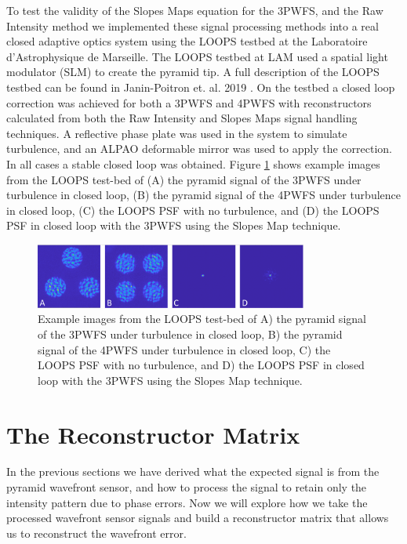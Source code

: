 To test the validity of the Slopes Maps equation for the 3PWFS, and the Raw Intensity method we implemented these signal processing methods into a real closed adaptive optics system using the LOOPS testbed at the Laboratoire d'Astrophysique de Marseille. The LOOPS testbed at LAM used a spatial light modulator (SLM) to create the pyramid tip. A full description of the LOOPS testbed can be found in Janin-Poitron et. al. 2019 \cite{janin2019adaptive}. On the testbed a closed loop correction was achieved for both a 3PWFS and 4PWFS with reconstructors calculated from both the Raw Intensity and Slopes Maps signal handling techniques. A reflective phase plate was used in the system to simulate turbulence, and an ALPAO deformable mirror was used to apply the correction. In all cases a stable closed loop was obtained. Figure \ref{fig:LOOOPS} shows example images from the LOOPS test-bed of (A) the pyramid signal of the 3PWFS under turbulence in closed loop, (B) the pyramid signal of the 4PWFS under turbulence in closed loop, (C) the LOOPS PSF with no turbulence, and (D) the LOOPS PSF in closed loop with the 3PWFS using the Slopes Map technique. 

\begin{figure}
    \centering
    \includegraphics[width=0.8\textwidth]{Chapter Materials/Chapter Two Materials/LOOPS.png}
    \caption{Example images from the LOOPS test-bed of A) the pyramid signal of the 3PWFS under turbulence in closed loop, B) the pyramid signal of the 4PWFS under turbulence in closed loop, C) the LOOPS PSF with no turbulence, and D) the LOOPS PSF in closed loop with the 3PWFS using the Slopes Map technique.}
    \label{fig:LOOOPS}
\end{figure}

\section{The Reconstructor Matrix}

In the previous sections we have derived what the expected signal is from the pyramid wavefront sensor, and how to process the signal to retain only the intensity pattern due to phase errors. Now we will explore how we take the processed wavefront sensor signals and build a reconstructor matrix that allows us to reconstruct the wavefront error. 
 
